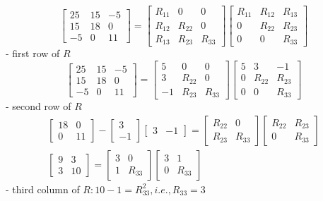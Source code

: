\begin{example}
    $$
\left[\begin{array}{rrr}
25 & 15 & -5 \\
15 & 18 & 0 \\
-5 & 0 & 11
\end{array}\right]=\left[\begin{array}{ccc}
R_{11} & 0 & 0 \\
R_{12} & R_{22} & 0 \\
R_{13} & R_{23} & R_{33}
\end{array}\right]\left[\begin{array}{ccc}
R_{11} & R_{12} & R_{13} \\
0 & R_{22} & R_{23} \\
0 & 0 & R_{33}
\end{array}\right]
$$
- first row of $ R $
$$
\left[\begin{array}{rrr}
25 & 15 & -5 \\
15 & 18 & 0 \\
-5 & 0 & 11
\end{array}\right]=\left[\begin{array}{rcc}
5 & 0 & 0 \\
3 & R_{22} & 0 \\
-1 & R_{23} & R_{33}
\end{array}\right]\left[\begin{array}{ccc}
5 & 3 & -1 \\
0 & R_{22} & R_{23} \\
0 & 0 & R_{33}
\end{array}\right]
$$
- second row of $ R $
$$
\begin{array}{c}
{\left[\begin{array}{rr}
18 & 0 \\
0 & 11
\end{array}\right]-\left[\begin{array}{r}
3 \\
-1
\end{array}\right]\left[\begin{array}{ll}
3 & -1
\end{array}\right]=\left[\begin{array}{cc}
R_{22} & 0 \\
R_{23} & R_{33}
\end{array}\right]\left[\begin{array}{cc}
R_{22} & R_{23} \\
0 & R_{33}
\end{array}\right]} \\
{\left[\begin{array}{rr}
9 & 3 \\
3 & 10
\end{array}\right]=\left[\begin{array}{cc}
3 & 0 \\
1 & R_{33}
\end{array}\right]\left[\begin{array}{cc}
3 & 1 \\
0 & R_{33}
\end{array}\right]}
\end{array}
$$
- third column of $ R: 10-1=R_{33}^{2}, i . e ., R_{33}=3 $
\end{example}